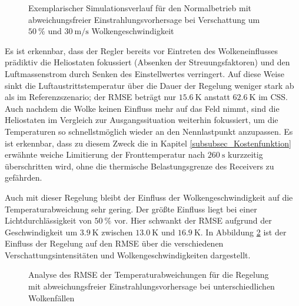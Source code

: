 \begin{figure}[h!]
    \centering
    \setlength{\fboxsep}{1pt}
    \setlength{\fboxrule}{1pt}
    \caption[Exemplarischer Simulationsverlauf für den Normalbetrieb mit abweichungsfreier Einstrahlungsvorhersage bei Verschattung um $\SI{50}{\percent}$ und $\SI{30}{\metre\per\second}$ Wolkengeschwindigkeit]{Exemplarischer Simulationsverlauf für den Normalbetrieb mit abweichungsfreier Einstrahlungsvorhersage bei Verschattung um $\SI{50}{\percent}$ und $\SI{30}{\metre\per\second}$ Wolkengeschwindigkeit}
    \label{fig_MPCallwissend5030}
\end{figure}


Es ist erkennbar, dass der Regler bereits vor Eintreten des Wolkeneinflusses prädiktiv die Heliostaten fokussiert (Absenken der Streuungsfaktoren) und den Luftmassenstrom durch Senken des Einstellwertes verringert.
Auf diese Weise sinkt die Luftaustrittstemperatur über die Dauer der Regelung weniger stark ab als im Referenzszenario; der RMSE beträgt nur $\SI{15.6}{\kelvin}$ anstatt $\SI{62.6}{\kelvin}$ im CSS.
Auch nachdem die Wolke keinen Einfluss mehr auf das Feld nimmt, sind die Heliostaten im Vergleich zur Ausgangssituation weiterhin fokussiert, um die Temperaturen so schnellstmöglich wieder an den Nennlastpunkt anzupassen.
Es ist erkennbar, dass zu diesem Zweck die in Kapitel \ref{subsubsec_Kostenfunktion} erwähnte weiche Limitierung der Fronttemperatur nach $\SI{260}{\second}$ kurzzeitig überschritten wird, ohne die thermische Belastungsgrenze des Receivers zu gefährden.

Auch mit dieser Regelung bleibt der Einfluss der Wolkengeschwindigkeit auf die Temperaturabweichung sehr gering.
Der größte Einfluss liegt bei einer Lichtdurchlässigkeit von $\SI{50}{\percent}$ vor.
Hier schwankt der RMSE aufgrund der Geschwindigkeit um $\SI{3.9}{\kelvin}$ zwischen $\SI{13.0}{\kelvin}$ und $\SI{16.9}{\kelvin}$.
In Abbildung \ref{fig_RMSEallwissend} ist der Einfluss der Regelung auf den RMSE über die verschiedenen Verschattungsintensitäten und Wolkengeschwindigkeiten dargestellt.

\begin{figure}[h!]
    \centering
    \setlength{\fboxsep}{1pt}
    \setlength{\fboxrule}{1pt}
    \caption[Analyse des RMSE der Temperaturabweichungen für die Regelung mit abweichungsfreier Einstrahlungsvorhersage bei unterschiedlichen Wolkenfällen]{Analyse des RMSE der Temperaturabweichungen für die Regelung mit abweichungsfreier Einstrahlungsvorhersage bei unterschiedlichen Wolkenfällen}
    \label{fig_RMSEallwissend}
\end{figure}

